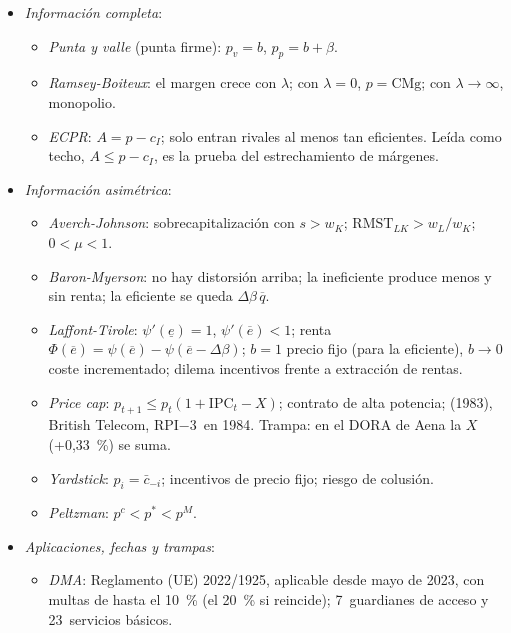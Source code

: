 \documentclass[11pt]{article}
\begin{document}
\begin{itemize}
\begin{itemize}
  \item \emph{Conductas anticompetitivas}: acuerdos colusorios (art.~101~del TFUE; art.~1~de la Ley~15/2007), abuso de posición dominante (art.~102; art.~2) y control de concentraciones.
  \end{itemize}
\item \emph{Información completa}:
  \begin{itemize}
  \item \emph{Punta y valle} (punta firme): $p_v=b$, $p_p=b+\beta$\nocite{Steiner1957Peak}.
  \item \emph{Ramsey-Boiteux}: el margen crece con $\lambda$; con $\lambda=0$, $p=\mathrm{CMg}$; con $\lambda\to\infty$, monopolio.
  \item \emph{ECPR}: $A=p-c_I$; solo entran rivales al menos tan eficientes. Leída como techo, $A\leq p-c_I$, es la prueba del estrechamiento de márgenes.
  \end{itemize}
\item \emph{Información asimétrica}:
  \begin{itemize}
  \item \emph{Averch-Johnson}: sobrecapitalización con $s>w_K$; $\mathrm{RMST}_{LK}>w_L/w_K$; $0<\mu<1$.
  \item \emph{Baron-Myerson}: no hay distorsión arriba; la ineficiente produce menos y sin renta; la eficiente se queda $\Delta\beta\,\overline{q}$.
  \item \emph{Laffont-Tirole}: $\psi'(\underline{e})=1$, $\psi'(\overline{e})<1$; renta $\Phi(\overline{e})=\psi(\overline{e})-\psi(\overline{e}-\Delta\beta)$; $b=1$ precio fijo (para la eficiente), $b\to0$ coste incrementado; dilema incentivos frente a extracción de rentas.
  \item \emph{Price cap}: $p_{t+1}\leq p_t(1+\mathrm{IPC}_t-X)$; contrato de alta potencia;  (1983), British Telecom, RPI$-$3~en 1984. Trampa: en el DORA de Aena la $X$ (+0,33~\%) se suma.
  \item \emph{Yardstick}: $p_i=\bar{c}_{-i}$; incentivos de precio fijo; riesgo de colusión.
  \item \emph{Peltzman}: $p^c<p^{*}<p^M$.
  \end{itemize}
\item \emph{Aplicaciones, fechas y trampas}:
  \begin{itemize}
  \item \emph{DMA}: Reglamento (UE) 2022/1925, aplicable desde mayo de 2023, con multas de hasta el 10~\% (el 20~\% si reincide)\nocite{UE2022DMA}; 7~guardianes de acceso y 23~servicios básicos\nocite{CE2026GuardianesDMA}.

\end{itemize}
\end{itemize}
\end{document}
